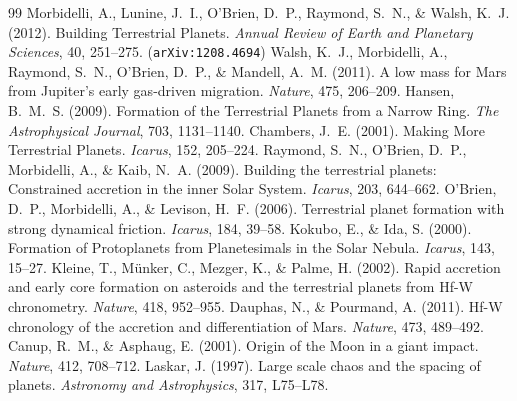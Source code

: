 \documentclass[11pt,a4paper]{article}
\begin{document}
\begin{thebibliography}{99}
 Morbidelli, A., Lunine, J.~I., O'Brien, D.~P., Raymond, S.~N., \& Walsh, K.~J. (2012). Building Terrestrial Planets. \textit{Annual Review of Earth and Planetary Sciences}, 40, 251--275. (\texttt{arXiv:1208.4694})
 Walsh, K.~J., Morbidelli, A., Raymond, S.~N., O'Brien, D.~P., \& Mandell, A.~M. (2011). A low mass for Mars from Jupiter's early gas-driven migration. \textit{Nature}, 475, 206--209.
 Hansen, B.~M.~S. (2009). Formation of the Terrestrial Planets from a Narrow Ring. \textit{The Astrophysical Journal}, 703, 1131--1140.
 Chambers, J.~E. (2001). Making More Terrestrial Planets. \textit{Icarus}, 152, 205--224.
 Raymond, S.~N., O'Brien, D.~P., Morbidelli, A., \& Kaib, N.~A. (2009). Building the terrestrial planets: Constrained accretion in the inner Solar System. \textit{Icarus}, 203, 644--662.
 O'Brien, D.~P., Morbidelli, A., \& Levison, H.~F. (2006). Terrestrial planet formation with strong dynamical friction. \textit{Icarus}, 184, 39--58.
 Kokubo, E., \& Ida, S. (2000). Formation of Protoplanets from Planetesimals in the Solar Nebula. \textit{Icarus}, 143, 15--27.
 Kleine, T., M\"unker, C., Mezger, K., \& Palme, H. (2002). Rapid accretion and early core formation on asteroids and the terrestrial planets from Hf-W chronometry. \textit{Nature}, 418, 952--955.
 Dauphas, N., \& Pourmand, A. (2011). Hf-W chronology of the accretion and differentiation of Mars. \textit{Nature}, 473, 489--492.
 Canup, R.~M., \& Asphaug, E. (2001). Origin of the Moon in a giant impact. \textit{Nature}, 412, 708--712.
 Laskar, J. (1997). Large scale chaos and the spacing of planets. \textit{Astronomy and Astrophysics}, 317, L75--L78.
\end{thebibliography}
\end{document}
